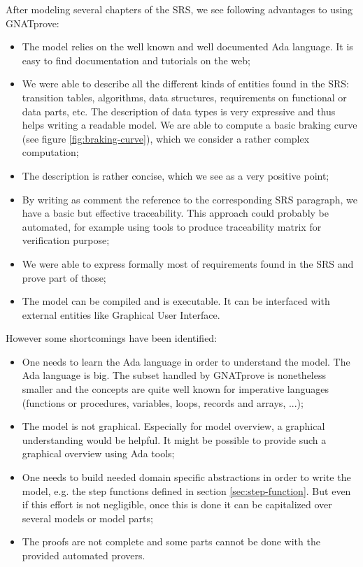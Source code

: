 \documentclass{template/openetcs_report}
\begin{document}
After modeling several chapters of the SRS, we see following
advantages to using GNATprove:

\begin{itemize}
\item The model relies on the well known and well documented Ada
  language. It is easy to find documentation and tutorials on the web;
\item We were able to describe all the different kinds of entities
  found in the SRS: transition tables, algorithms, data structures,
  requirements on functional or data parts, etc. The description of
  data types is very expressive and thus helps writing a readable
  model. We are able to compute a basic braking curve (see figure
  \ref{fig:braking-curve}), which we consider a rather complex
  computation;
\item The description is rather concise, which we see as a very
  positive point;
\item By writing as comment the reference to the corresponding SRS
  paragraph, we have a basic but effective traceability. This approach
  could probably be automated, for example using tools to produce
  traceability matrix for verification purpose;
\item We were able to express formally most of requirements found in
  the SRS and prove part of those;
\item The model can be compiled and is executable. It can be
  interfaced with external entities like Graphical User Interface.
\end{itemize}

However some shortcomings have been identified:
\begin{itemize}
\item One needs to learn the Ada language in order to understand the
  model. The Ada language is big. The subset handled by GNATprove is
  nonetheless smaller and the concepts are quite well known for
  imperative languages (functions or procedures, variables, loops,
  records and arrays, ...);
\item The model is not graphical. Especially for model overview, a
  graphical understanding would be helpful. It might be possible to
  provide such a graphical overview using Ada tools;
\item One needs to build needed domain specific abstractions in order
  to write the model, e.g. the step functions defined in section
  \ref{sec:step-function}. But even if this effort is not negligible,
  once this is done it can be capitalized over several models or model
  parts;
\item The proofs are not complete and some parts cannot be done with
  the provided automated provers.
\end{itemize}
\end{document}
